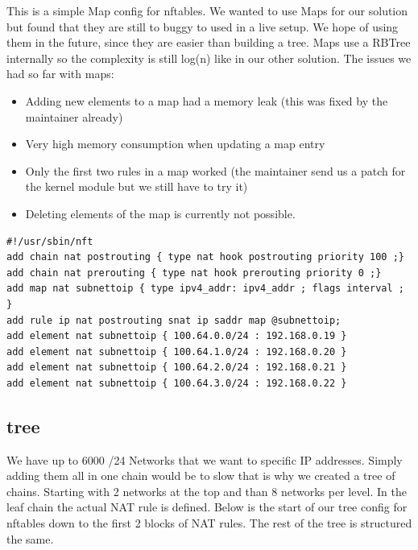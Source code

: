 \documentclass{report}
\begin{document}
This is a simple Map config for nftables. We wanted to use Maps for our
solution but found that they are still to buggy to used in a live setup.
We hope of using them in the future, since they are easier than building
a tree. Maps use a RBTree internally so the complexity is still
log(n) like in our other solution. The issues we had so far with maps:

\begin{itemize}
\itemsep1pt\parskip0pt
\item
  Adding new elements to a map had a memory leak (this was fixed by the
  maintainer already)
\item
  Very high memory consumption when updating a map entry
\item
  Only the first two rules in a map worked (the maintainer send us a
  patch for the kernel module but we still have to try it)
\item
  Deleting elements of the map is currently not possible.
\end{itemize}

\begingroup
\fontsize{9pt}{9pt}\selectfont
\begin{verbatim}
#!/usr/sbin/nft
add chain nat postrouting { type nat hook postrouting priority 100 ;}
add chain nat prerouting { type nat hook prerouting priority 0 ;}
add map nat subnettoip { type ipv4_addr: ipv4_addr ; flags interval ; }
add rule ip nat postrouting snat ip saddr map @subnettoip;
add element nat subnettoip { 100.64.0.0/24 : 192.168.0.19 }
add element nat subnettoip { 100.64.1.0/24 : 192.168.0.20 }
add element nat subnettoip { 100.64.2.0/24 : 192.168.0.21 }
add element nat subnettoip { 100.64.3.0/24 : 192.168.0.22 }
\end{verbatim}
\endgroup

\subsection{tree}

We have up to 6000 /24 Networks that we want to specific IP addresses.
Simply adding them all in one chain would be to slow that is why we
created a tree of chains. Starting with 2 networks at the top and than 8
networks per level. In the leaf chain the actual NAT rule is defined.
Below is the start of our tree config for nftables down to the first 2
blocks of NAT rules. The rest of the tree is structured the same.
\end{document}
